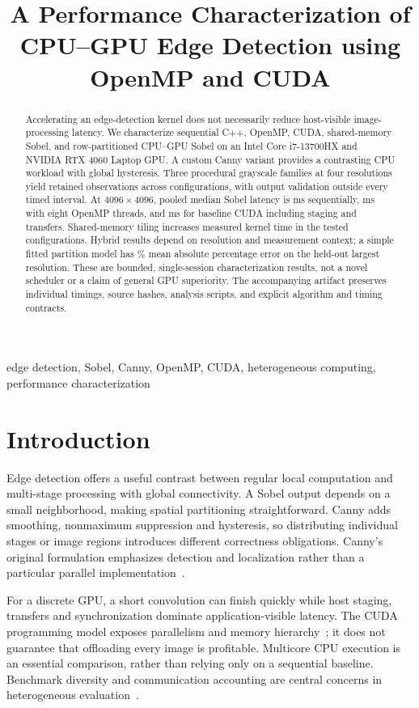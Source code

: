 \documentclass[conference]{IEEEtran}
\title{A Performance Characterization of CPU--GPU Edge Detection using OpenMP and CUDA}
\author{\IEEEauthorblockN{Author information pending}
\IEEEauthorblockA{Affiliation and contact information pending\\Research draft: human review required before submission}}
\begin{document}
\maketitle
\begin{abstract}
Accelerating an edge-detection kernel does not necessarily reduce host-visible image-processing latency. We characterize sequential C++, OpenMP, CUDA, shared-memory Sobel, and row-partitioned CPU--GPU Sobel on an Intel Core i7-13700HX and NVIDIA RTX 4060 Laptop GPU. A custom Canny variant provides a contrasting CPU workload with global hysteresis. Three procedural grayscale families at four resolutions yield \ObservationCount{} retained observations across \ConfigurationCount{} configurations, with output validation outside every timed interval. At $4096\times4096$, pooled median Sobel latency is \SeqLarge{} ms sequentially, \OmpLarge{} ms with eight OpenMP threads, and \CudaLarge{} ms for baseline CUDA including staging and transfers. Shared-memory tiling increases measured kernel time in the tested configurations. Hybrid results depend on resolution and measurement context; a simple fitted partition model has \ModelError{}\% mean absolute percentage error on the held-out largest resolution. These are bounded, single-session characterization results, not a novel scheduler or a claim of general GPU superiority. The accompanying artifact preserves individual timings, source hashes, analysis scripts, and explicit algorithm and timing contracts.
\end{abstract}
\begin{IEEEkeywords}
edge detection, Sobel, Canny, OpenMP, CUDA, heterogeneous computing, performance characterization
\end{IEEEkeywords}

\section{Introduction}
Edge detection offers a useful contrast between regular local computation and multi-stage processing with global connectivity. A Sobel output depends on a small neighborhood, making spatial partitioning straightforward. Canny adds smoothing, nonmaximum suppression and hysteresis, so distributing individual stages or image regions introduces different correctness obligations. Canny's original formulation emphasizes detection and localization rather than a particular parallel implementation~\cite{canny1986}.

For a discrete GPU, a short convolution can finish quickly while host staging, transfers and synchronization dominate application-visible latency. The CUDA programming model exposes parallelism and memory hierarchy~\cite{nickolls}; it does not guarantee that offloading every image is profitable. Multicore CPU execution is an essential comparison, rather than relying only on a sequential baseline. Benchmark diversity and communication accounting are central concerns in heterogeneous evaluation~\cite{rodinia}.
\end{document}
